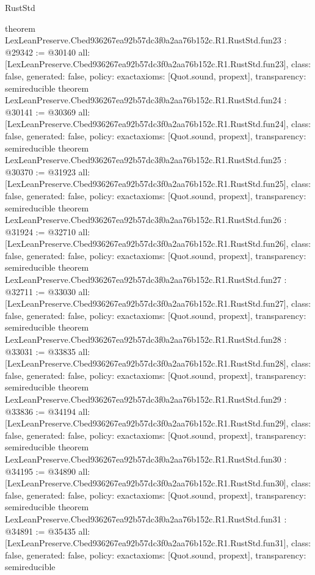 \begin{lexlean}{RustStd}
\begin{coremodule}
{}
theorem LexLeanPreserve.Cbed936267ea92b57dc3f0a2aa76b152c.R1.RustStd.fun23 : @29342 := @30140 {
  all: [LexLeanPreserve.Cbed936267ea92b57dc3f0a2aa76b152c.R1.RustStd.fun23],
  class: false,
  generated: false,
  policy: exact{axioms: [Quot.sound, propext]},
  transparency: semireducible
}
theorem LexLeanPreserve.Cbed936267ea92b57dc3f0a2aa76b152c.R1.RustStd.fun24 : @30141 := @30369 {
  all: [LexLeanPreserve.Cbed936267ea92b57dc3f0a2aa76b152c.R1.RustStd.fun24],
  class: false,
  generated: false,
  policy: exact{axioms: [Quot.sound, propext]},
  transparency: semireducible
}
theorem LexLeanPreserve.Cbed936267ea92b57dc3f0a2aa76b152c.R1.RustStd.fun25 : @30370 := @31923 {
  all: [LexLeanPreserve.Cbed936267ea92b57dc3f0a2aa76b152c.R1.RustStd.fun25],
  class: false,
  generated: false,
  policy: exact{axioms: [Quot.sound, propext]},
  transparency: semireducible
}
theorem LexLeanPreserve.Cbed936267ea92b57dc3f0a2aa76b152c.R1.RustStd.fun26 : @31924 := @32710 {
  all: [LexLeanPreserve.Cbed936267ea92b57dc3f0a2aa76b152c.R1.RustStd.fun26],
  class: false,
  generated: false,
  policy: exact{axioms: [Quot.sound, propext]},
  transparency: semireducible
}
theorem LexLeanPreserve.Cbed936267ea92b57dc3f0a2aa76b152c.R1.RustStd.fun27 : @32711 := @33030 {
  all: [LexLeanPreserve.Cbed936267ea92b57dc3f0a2aa76b152c.R1.RustStd.fun27],
  class: false,
  generated: false,
  policy: exact{axioms: [Quot.sound, propext]},
  transparency: semireducible
}
theorem LexLeanPreserve.Cbed936267ea92b57dc3f0a2aa76b152c.R1.RustStd.fun28 : @33031 := @33835 {
  all: [LexLeanPreserve.Cbed936267ea92b57dc3f0a2aa76b152c.R1.RustStd.fun28],
  class: false,
  generated: false,
  policy: exact{axioms: [Quot.sound, propext]},
  transparency: semireducible
}
theorem LexLeanPreserve.Cbed936267ea92b57dc3f0a2aa76b152c.R1.RustStd.fun29 : @33836 := @34194 {
  all: [LexLeanPreserve.Cbed936267ea92b57dc3f0a2aa76b152c.R1.RustStd.fun29],
  class: false,
  generated: false,
  policy: exact{axioms: [Quot.sound, propext]},
  transparency: semireducible
}
theorem LexLeanPreserve.Cbed936267ea92b57dc3f0a2aa76b152c.R1.RustStd.fun30 : @34195 := @34890 {
  all: [LexLeanPreserve.Cbed936267ea92b57dc3f0a2aa76b152c.R1.RustStd.fun30],
  class: false,
  generated: false,
  policy: exact{axioms: [Quot.sound, propext]},
  transparency: semireducible
}
theorem LexLeanPreserve.Cbed936267ea92b57dc3f0a2aa76b152c.R1.RustStd.fun31 : @34891 := @35435 {
  all: [LexLeanPreserve.Cbed936267ea92b57dc3f0a2aa76b152c.R1.RustStd.fun31],
  class: false,
  generated: false,
  policy: exact{axioms: [Quot.sound, propext]},
  transparency: semireducible
}
\end{coremodule}
\end{lexlean}
